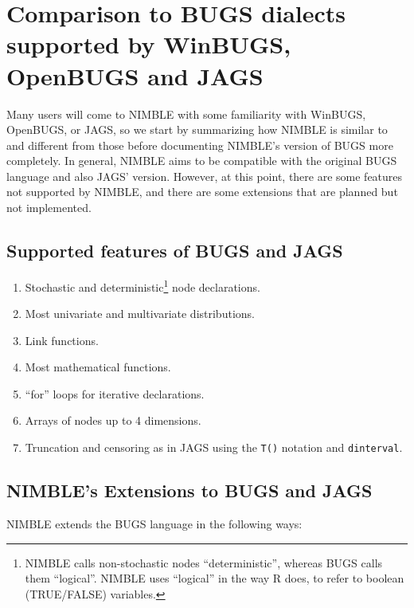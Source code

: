 \documentclass[12pt,oneside]{book}\usepackage[]{graphicx}\usepackage[]{color}
\def\cd#1{\texttt{#1}}
\begin{document}
\section{Comparison to BUGS dialects supported by WinBUGS, OpenBUGS and JAGS}
\label{sec:supp-feat-bugs}

Many users will come to NIMBLE with some familiarity with WinBUGS,
OpenBUGS, or JAGS, so we start by summarizing how NIMBLE is similar to
and different from those before documenting NIMBLE's version of BUGS
more completely.  In general, NIMBLE aims to be compatible with the
original BUGS language and also JAGS' version.  However, at this
point, there are some features not supported by NIMBLE, and there are
some extensions that are planned but not implemented.

\subsection{Supported features of BUGS and JAGS}

\begin{enumerate}
\item Stochastic and deterministic\footnote{NIMBLE calls non-stochastic nodes ``deterministic'', whereas BUGS calls them ``logical''. NIMBLE uses ``logical'' in the way R does, to refer to boolean (TRUE/FALSE) variables.} node declarations.
\item Most univariate and multivariate distributions.
\item Link functions.
\item Most mathematical functions.
\item ``for'' loops for iterative declarations.
\item Arrays of nodes up to 4 dimensions.
\item Truncation and censoring as in JAGS using the \cd{T()}
  notation and \cd{dinterval}.
\end{enumerate}

\subsection{NIMBLE's Extensions to BUGS and JAGS}
\label{sec:extensions-bugs}

NIMBLE extends the BUGS language in the following ways:
\end{document}
